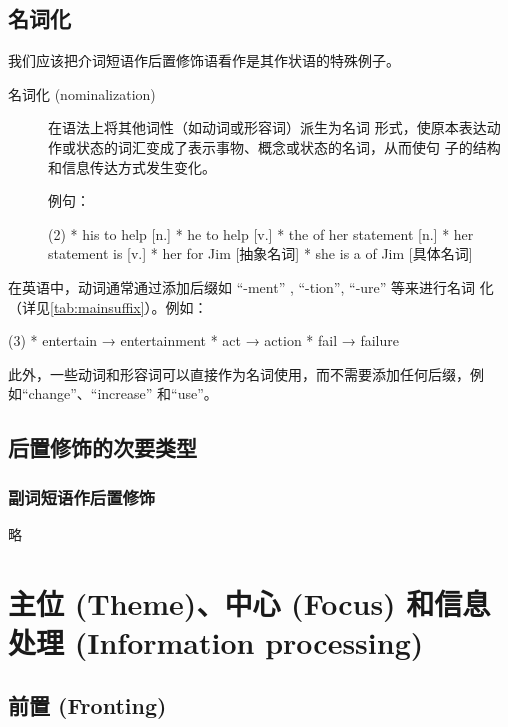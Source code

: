 \section{名词化}

我们应该把介词短语作后置修饰语看作是其作状语的特殊例子。

\begin{description}
\item[名词化 (nominalization)] 在语法上将其他词性（如动词或形容词）派生为名词
  形式，使原本表达动作或状态的词汇变成了表示事物、概念或状态的名词，从而使句
  子的结构和信息传达方式发生变化。


  例句：
  \begin{taskitem}(2)
    * his  to help [n.]
    * he  to help [v.]
    * the  of her statement [n.]
    * her statement is   [v.]
    * her  for Jim [抽象名词]
    * she is a  of Jim [具体名词]
  \end{taskitem}
\end{description}

在英语中，动词通常通过添加后缀如 ``-ment'' , ``-tion'', ``-ure'' 等来进行名词
化（详见\cref{tab:mainsuffix}）。例如：
\begin{taskitem}(3)
* entertain → entertainment
* act → action
* fail → failure
\end{taskitem}
此外，一些动词和形容词可以直接作为名词使用，而不需要添加任何后缀，例
如``change''、``increase'' 和``use''。

\section{后置修饰的次要类型}

\subsection{副词短语作后置修饰}

略



\chapter{主位 (Theme)、中心 (Focus) 和信息处理 (Information processing)}


\section{前置 (Fronting)}

